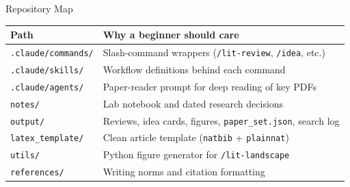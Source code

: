 \documentclass[aspectratio=169,professionalfonts]{beamer}
\begin{document}
\begin{frame}[t]{Repository Map}
\scriptsize
\begin{tabular}{>{\raggedright\arraybackslash}p{} >{\raggedright\arraybackslash}p{}}
\toprule
\textbf{Path} & \textbf{Why a beginner should care} \\
\midrule
\texttt{.claude/commands/} & Slash-command wrappers (\texttt{/lit-review}, \texttt{/idea}, etc.) \\
\texttt{.claude/skills/} & Workflow definitions behind each command \\
\texttt{.claude/agents/} & Paper-reader prompt for deep reading of key PDFs \\
\texttt{notes/} & Lab notebook and dated research decisions \\
\texttt{output/} & Reviews, idea cards, figures, \texttt{paper\_set.json}, search log \\
\texttt{latex\_template/} & Clean article template (\texttt{natbib} + \texttt{plainnat}) \\
\texttt{utils/} & Python figure generator for \texttt{/lit-landscape} \\
\texttt{references/} & Writing norms and citation formatting \\
\bottomrule
\end{tabular}
\end{frame}
\end{document}

